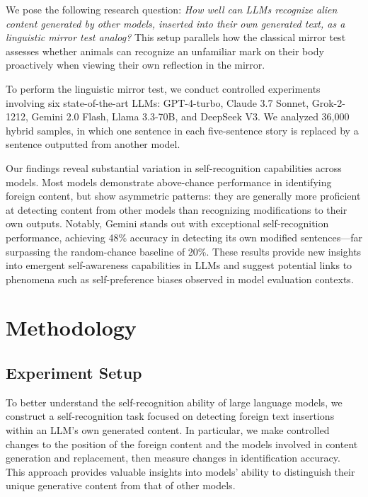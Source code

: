 \documentclass{article}
\begin{document}
We pose the following research question: \emph{How well can LLMs recognize alien content generated by other models, inserted into their own generated text, as a linguistic mirror test analog?} This setup parallels how the classical mirror test assesses whether animals can recognize an unfamiliar mark on their body proactively when viewing their own reflection in the mirror.


To perform the linguistic mirror test, we conduct controlled experiments involving six state-of-the-art LLMs: GPT-4-turbo, Claude 3.7 Sonnet, Grok-2-1212, Gemini 2.0 Flash, Llama 3.3-70B, and DeepSeek V3. We analyzed 36,000 hybrid samples, in which one sentence in each five-sentence story is replaced by a sentence outputted from another model.



Our findings reveal substantial variation in self-recognition capabilities across models. Most models demonstrate above-chance performance in identifying foreign content, but show asymmetric patterns: they are generally more proficient at detecting content from other models than recognizing modifications to their own outputs. Notably, Gemini stands out with exceptional self-recognition performance, achieving 48\% accuracy in detecting its own modified sentences—far surpassing the random-chance baseline of 20\%. These results provide new insights into emergent self-awareness capabilities in LLMs and suggest potential links to phenomena such as self-preference biases observed in model evaluation contexts.






\section{Methodology}

\subsection{Experiment Setup}

To better understand the self-recognition ability of large language models, we construct a self-recognition task focused on detecting foreign text insertions within an LLM's own generated content. In particular, we make controlled changes to the position of the foreign content and the models involved in content generation and replacement, then measure changes in identification accuracy. This approach provides valuable insights into models' ability to distinguish their unique generative content from that of other models.
\end{document}
